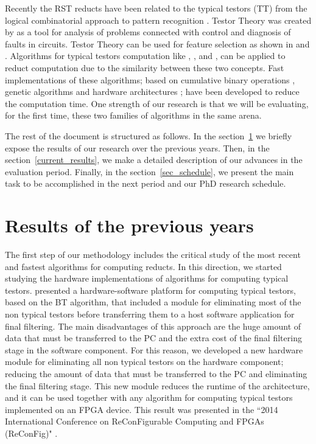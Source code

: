 \documentclass[authoryear,11pt]{elsarticle}
\begin{document}
  Recently the RST reducts have been related to the typical testors (TT) from the logical combinatorial approach 
  to pattern recognition \citep{Lazo15}. Testor Theory was created by \cite{Cheguis55} as a tool for analysis of 
  problems connected with control and diagnosis of faults in circuits. 
  Testor Theory can be used for feature selection as shown in \citep{Ruiz08} and \citep{Martinez01}. Algorithms for
  typical testors computation like \citep{Ruiz85}, \citep{Santiesteban03}, \citep{Sanchez07} 
  and \citep{Lias09}, can be applied to reduct computation due to the similarity between these two concepts. 
  Fast implementations of these algorithms; based on cumulative binary operations \citep{Sanchez10}, genetic 
  algorithms \citep{Sanchez99} and hardware architectures \citep{Rojas12}; have been developed to reduce the
  computation time. One strength of our research is that we will be evaluating, for the first time, these two 
  families of algorithms in the same arena.
  
  
  The rest of the document is structured as follows. In the section~\ref{previous_results} we briefly expose the results of our research over the previous years. Then, in the section~\ref{current_results}, we make a detailed description of our advances in the evaluation period. Finally, in the section~\ref{sec_schedule}, we present the main task to be accomplished in the next period and our PhD research schedule.
  
  \section{Results of the previous years}\label{previous_results}
  
  The first step of our methodology includes the critical study of the most recent and fastest algorithms for computing reducts. In this direction, we started studying the hardware implementations of algorithms for computing typical testors. \cite{Rojas12} presented a hardware-software platform for computing typical testors, based on the BT algorithm, that included a module for eliminating most of the non typical testors before transferring them to a host software application for final filtering. The main disadvantages of this approach are the huge amount of data that must be transferred to the PC and the extra cost of the final filtering stage in the software component.  For this reason, we developed a new hardware module for eliminating all non typical testors on the hardware	component; reducing the amount of data that must be transferred to the PC and eliminating the final filtering	stage. 	This new module reduces the runtime of the architecture, and it can be used together with any algorithm for computing typical testors implemented on an FPGA device. This result was presented in the ``2014 International Conference on ReConFigurable Computing and FPGAs (ReConFig)"  \citep{Rodriguez14}. 
  
\end{document}
